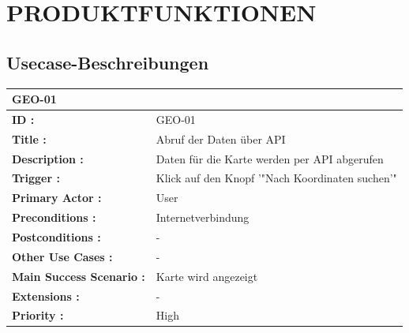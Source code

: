 	\section{\Large PRODUKTFUNKTIONEN}
	\subsection{Usecase-Beschreibungen}

	\begin{table}[H]
		\begin{tabular}{|p{8cm}|p{8cm}|}
			\hline
			\textbf{GEO-01 } \\ 
			\hline
			\textbf{ID :}\centering & GEO-01  \\ \hline 
			\textbf{Title :}\centering & Abruf der Daten über API \\ \hline 
			\textbf{Description :}\centering & Daten für die Karte werden per API abgerufen \\ \hline 
			\textbf{Trigger :}\centering & Klick auf den Knopf '"Nach Koordinaten suchen'" \\ \hline 
			\textbf{Primary Actor :} \centering & User \\ \hline 
			\textbf{Preconditions :}\centering & Internetverbindung\\ \hline 
			\textbf{Postconditions :}\centering & - \\ \hline
			\textbf{Other Use Cases :}\centering & - \\ \hline  
			\textbf{Main Success Scenario :}\centering & Karte wird angezeigt \\ \hline  
			\textbf{Extensions :}\centering & - \\ \hline  
			\textbf{Priority :}\centering & High \\ \hline  
		\end{tabular}
	\end{table}
